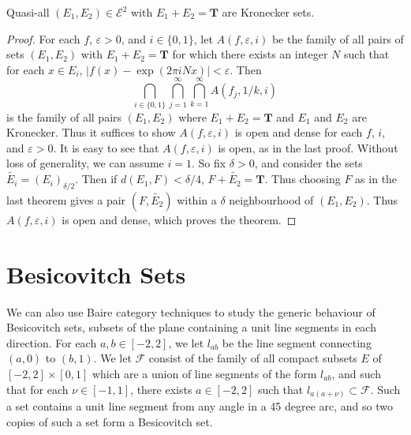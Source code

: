 \begin{theorem}
	Quasi-all $(E_1,E_2) \in \mathcal{E}^2$ with $E_1 + E_2 = \mathbf{T}$ are Kronecker sets.
\end{theorem}
\begin{proof}
	For each $f$, $\varepsilon > 0$, and $i \in \{ 0, 1 \}$, let $A(f,\varepsilon,i)$ be the family of all pairs of sets $(E_1, E_2)$ with $E_1 + E_2 = \mathbf{T}$ for which there exists an integer $N$ such that for each  $x \in E_i$, $|f(x) - \exp(2 \pi i N x)| < \varepsilon$. Then
	\[ \bigcap_{i \in \{ 0, 1 \}} \bigcap_{j = 1}^\infty \bigcap_{k = 1}^\infty A(f_j,1/k,i) \]
	is the family of all pairs $(E_1,E_2)$ where $E_1 + E_2 = \mathbf{T}$ and $E_1$ and $E_2$ are Kronecker. Thus it suffices to show $A(f,\varepsilon,i)$ is open and dense for each $f$, $i$, and $\varepsilon > 0$. It is easy to see that $A(f,\varepsilon,i)$ is open, as in the last proof. Without loss of generality, we can assume $i = 1$. So fix $\delta > 0$, and consider the sets $\widetilde{E_i} = (E_i)_{\delta/2}$. Then if $d(E_1,F) < \delta/4$, $F + \tilde{E_2} = \mathbf{T}$. Thus choosing $F$ as in the last theorem gives a pair $(F,\tilde{E_2})$ within a $\delta$ neighbourhood of $(E_1,E_2)$. Thus $A(f,\varepsilon,i)$ is open and dense, which proves the theorem.
\end{proof}

\section{Besicovitch Sets}

We can also use Baire category techniques to study the generic behaviour of Besicovitch sets, subsets of the plane containing a unit line segments in each direction. For each $a,b \in [-2,2]$, we let $l_{ab}$ be the line segment connecting $(a,0)$ to $(b,1)$. We let $\mathcal{F}$ consist of the family of all compact subsets $E$ of $[-2,2] \times [0,1]$ which are a union of line segments of the form $l_{ab}$, and such that for each $\nu \in [-1,1]$, there exists $a \in [-2,2]$ such that $l_{a(a+\nu)} \subset \mathcal{F}$. Such a set contains a unit line segment from any angle in a 45 degree arc, and so two copies of such a set form a Besicovitch set.

